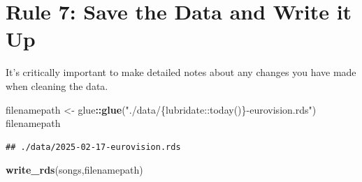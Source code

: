 \documentclass[
]{article}
\newenvironment{Shaded}{\begin{snugshade}}{\end{snugshade}}
\newcommand{\FunctionTok}[1]{\textcolor[rgb]{0.13,0.29,0.53}{\textbf{#1}}}
\newcommand{\NormalTok}[1]{#1}
\newcommand{\OtherTok}[1]{\textcolor[rgb]{0.56,0.35,0.01}{#1}}
\newcommand{\SpecialCharTok}[1]{\textcolor[rgb]{0.81,0.36,0.00}{\textbf{#1}}}
\newcommand{\StringTok}[1]{\textcolor[rgb]{0.31,0.60,0.02}{#1}}
\begin{document}
\section{Rule 7: Save the Data and Write it
Up}\label{rule-7-save-the-data-and-write-it-up}

It's critically important to make detailed notes about any changes you
have made when cleaning the data.

\begin{Shaded}
\begin{Highlighting}[]
\NormalTok{filenamepath }\OtherTok{\textless{}{-}}\NormalTok{ glue}\SpecialCharTok{::}\FunctionTok{glue}\NormalTok{(}\StringTok{"./data/\{lubridate::today()\}{-}eurovision.rds"}\NormalTok{)}
\NormalTok{filenamepath}
\end{Highlighting}
\end{Shaded}

\begin{verbatim}
## ./data/2025-02-17-eurovision.rds
\end{verbatim}

\begin{Shaded}
\begin{Highlighting}[]
\FunctionTok{write\_rds}\NormalTok{(songs,filenamepath)}
\end{Highlighting}
\end{Shaded}
\end{document}
